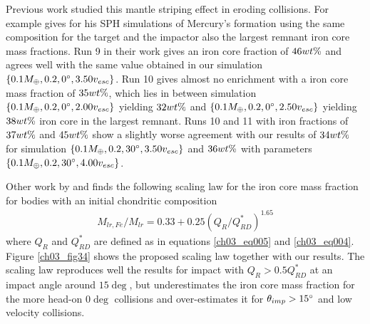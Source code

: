 Previous work studied this mantle striping effect in eroding collisions. For example \cite{Benz:1988p3336} gives for his SPH simulations of Mercury's formation using the same composition for the target and the impactor also the largest remnant iron core mass fractions. Run 9 in their work gives an iron core fraction of $46 wt\mathrm{\%}$ and agrees well with the same value obtained in our simulation $\{ 0.1 M_{\oplus}, 0.2,  0 ^\circ, 3.50 v_{esc} \}$. Run 10 gives almost no enrichment with a iron core mass fraction of $35 wt\mathrm{\%}$, which lies in between simulation $\{ 0.1 M_{\oplus}, 0.2,  0 ^\circ, 2.00 v_{esc} \}$ yielding $32 wt\mathrm{\%}$ and  $\{ 0.1 M_{\oplus}, 0.2,  0 ^\circ, 2.50 v_{esc} \}$ yielding $38 wt\mathrm{\%}$ iron core in the largest remnant. Runs 10 and 11 with iron fractions of $37 wt\mathrm{\%}$ and $45 wt\mathrm{\%}$ show a slightly worse agreement with our results of $34 wt\mathrm{\%}$ for simulation $\{ 0.1 M_{\oplus}, 0.2,  30 ^\circ, 3.50 v_{esc} \}$ and $36 wt\mathrm{\%}$ with parameters $\{ 0.1 M_{\oplus}, 0.2,  30 ^\circ, 4.00 v_{esc} \}$.

Other work by \cite{2009ApJ...700L.118M} and \cite{2010ApJ...712L..73M} finds the following scaling law for the iron core mass fraction for bodies with an initial chondritic composition 
\begin{align}
M_{lr, Fe} / M_{lr} = 0.33 + 0.25 ( Q_R / Q^*_{RD} )^{1.65}
\end{align}
where $Q_R$ and $Q^*_{RD}$ are defined as in equations \ref{ch03_eq005} and \ref{ch03_eq004}. Figure \ref{ch03_fig34} shows the proposed scaling law together with our results. The scaling law reproduces well the results for impact with $Q_R > 0.5 Q^*_{RD}$ at an impact angle around $15 \deg$, but underestimates the iron core mass fraction for the more head-on $0\deg$ collisions and over-estimates it for $\theta_{imp} > 15 ^\circ$ and low velocity collisions.

